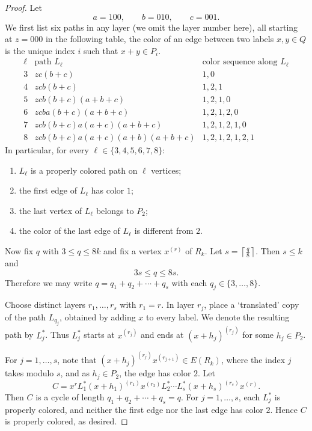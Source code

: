 \documentclass[10pt,a4paper]{amsart}
\begin{document}
\begin{proof}
Let
\[
a=100,
\qquad
b=010,
\qquad
c=001.
\]
We first list six paths in any layer (we omit the layer number here), all starting at $z=000$ in the following table,  the color of an edge between two labels $x,y\in Q$ is the unique index $i$ such that $x+y\in P_i$. 
\[
\begin{array}{c|l|l}
\ell & \text{path }L_\ell & \text{color sequence along }L_\ell\\
\hline
3 & zc(b+c) & 1,0 \\
4 & zcb(b+c) & 1,2,1 \\
5 & zcb(b+c)(a+b+c) & 1,2,1,0\\
6 & zcba(b+c)(a+b+c) & 1,2,1,2,0 \\
7 & zcb(b+c)a(a+c)(a+b+c) & 1,2,1,2,1,0 \\
8 & zcb(b+c)a(a+c)(a+b)(a+b+c) & 1,2,1,2,1,2,1
\end{array}
\]
 In particular, for every $\ell\in\{3,4,5,6,7,8\}$:
\begin{enumerate}[label=(\alph*)]
\item $L_\ell$ is a properly colored path on $\ell$ vertices;
\item the first edge of $L_\ell$ has color $1$;
\item the last vertex of $L_\ell$ belongs to $P_2$;
\item the color of the last edge of $L_\ell$ is different from $2$.
\end{enumerate}

Now fix $q$ with $3\le q\le 8k$ and fix a vertex $x^{(r)}$ of $R_k$. Let $s=\left\lceil \frac{q}{8}\right\rceil$.
Then $s\le k$ and
\[
3s\le q\le 8s.
\]
Therefore we may write
$q=q_1+q_2+\cdots+q_s$
with each $q_j\in\{3,\dots,8\}$. %

Choose distinct layers $r_1,\ldots,r_s$ with $r_1=r$. In layer $r_j$, place a `translated' copy of the path $L_{q_j}$, obtained by adding $x$ to every label. We denote the resulting path by $L_j^*$. Thus $L_j^*$ starts at $x^{(r_j)}$ and ends at $(x+h_j)^{(r_j)}$ for some $h_j\in P_2$.

For $j=1,\ldots,s$, note that $(x+h_j)^{(r_j)}x^{(r_{j+1})}\in E(R_k)$, where the index $j$ takes modulo $s$, and as $h_j\in P_2$, the edge has color $2$.
Let \[
C=x^{r}L_1^*(x+h_1)^{(r_1)}x^{(r_{2})}L_2^*\cdots L_s^*(x+h_s)^{(r_s)}x^{(r)}.
\]
Then $C$ is a cycle of length $q_1+q_2+\cdots+q_s=q$. 
For $j=1,\dots,s$, each $L_j^*$ is properly colored, and neither the first edge nor the last edge has color $2$. Hence $C$ is properly colored, as desired.
\end{proof}
\end{document}

